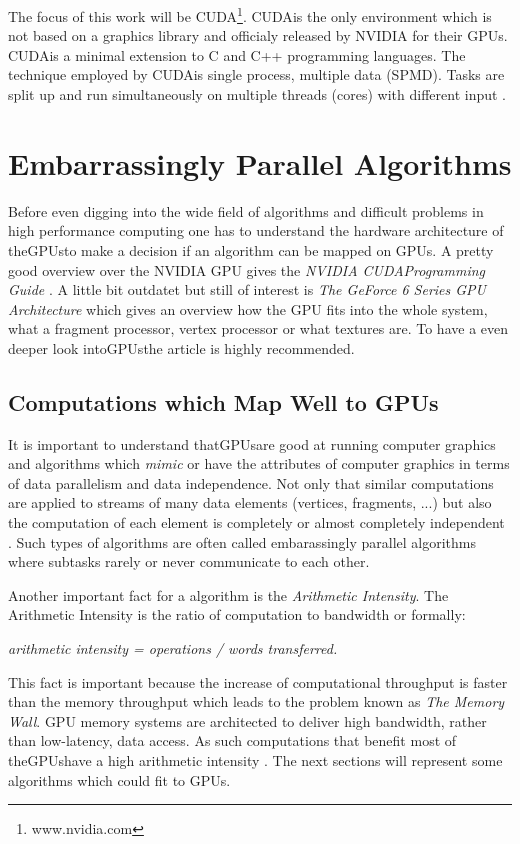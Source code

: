 The focus of this work will be CUDA\footnote{www.nvidia.com}. \gls{CUDA}is the only
environment which is not based on a graphics library and officialy released by
NVIDIA for their GPUs. \gls{CUDA}is a minimal extension to C and C++ programming
languages. The technique employed by \gls{CUDA}is single process, multiple data
 (SPMD). Tasks are split up and run simultaneously on multiple threads (cores)
with different input \citep{citeulike:3072519}.

\section{Embarrassingly Parallel Algorithms} %
\label{ssub:choosing_a_fast_algorithm}
Before even digging into the wide field of algorithms and difficult problems in
high performance computing one has to understand the hardware architecture of
the\glspl{GPU}to make a decision if an algorithm can be mapped on GPUs. A pretty good
overview over the NVIDIA \gls{GPU} gives the \emph{NVIDIA \gls{CUDA}Programming Guide}
\citep{citeulike:3325943}. A little bit outdatet but still of interest is
\emph{The GeForce 6 Series \gls{GPU} Architecture}\citep{citeulike:3757915} which gives
an overview how the \gls{GPU} fits into the whole system, what a fragment processor,
vertex processor or what textures are. To have a even deeper look into\glspl{GPU}the
article \citep{citeulike:2790995} is highly recommended.

\subsection{Computations which Map Well to GPUs} %
\label{par:computations_which_map_well_to_GPUs}
It is important to understand that\glspl{GPU}are good at running computer graphics
and algorithms which \emph{mimic} or have the attributes of computer graphics in
terms of data parallelism and data independence. Not only that similar
computations are applied to streams of many data elements (vertices, fragments,
...) but also the computation of each element is completely or almost completely
independent \citep{citeulike:3733428}. Such types of algorithms are often called
embarassingly parallel algorithms where subtasks rarely or never communicate to
each other.

Another important fact for a algorithm is the \emph{Arithmetic Intensity}. The
Arithmetic Intensity is the ratio of computation to bandwidth or formally:
\begin{center} 
 \emph{arithmetic intensity = operations / words transferred.}
\end{center}
This fact is important because the increase of computational throughput is
faster than the memory throughput which leads to the problem known as \emph{The
Memory Wall}. \gls{GPU} memory systems are architected to deliver high bandwidth,
rather than low-latency, data access. As such computations that benefit most of
the\glspl{GPU}have a high arithmetic intensity \citep{citeulike:3733428}. The next 
sections will represent some algorithms which could fit to GPUs. 


